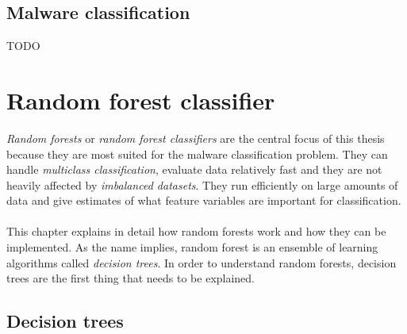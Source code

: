 \documentclass[11pt]{article}
\begin{document}
    \subsection{Malware classification}
      {\color{red}TODO}
  \newpage
  \section{Random forest classifier}
    {\it Random forests} or {\it random forest classifiers} are the central focus of this thesis because they are most suited for the malware classification problem. They can handle {\it multiclass classification}, evaluate data relatively fast and they are not heavily affected by {\it imbalanced datasets}. \citep{brabec} They run efficiently on large amounts of data and give estimates of what feature variables are important for classification. \citep{breiman}
    \\~\\
    This chapter explains in detail how random forests work and how they can be implemented. As the name implies, random forest is an ensemble of learning algorithms called {\it decision trees}. In order to understand random forests, decision trees are the first thing that needs to be explained.
    \subsection{Decision trees}
\end{document}

